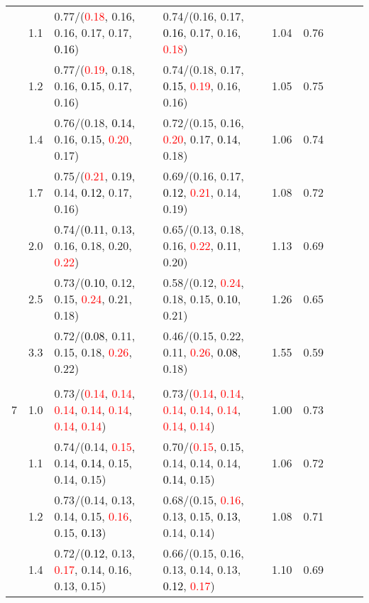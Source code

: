 \documentclass[10pt,a4paper]{report}
\begin{document}
\begin{table}[!htbp]
\begin{center}
{\begin{tabular}{ccllccccc}
			&1.1&0.77/(\textcolor{red}{0.18}, 0.16, 0.16, 0.17, 0.17, \textcolor{black}{0.16})&0.74/(0.16, 0.17, \textcolor{black}{0.16}, 0.17, 0.16, \textcolor{red}{0.18})&1.04&0.76\\
			&1.2&0.77/(\textcolor{red}{0.19}, 0.18, 0.16, \textcolor{black}{0.15}, 0.17, 0.16)&0.74/(0.18, 0.17, \textcolor{black}{0.15}, \textcolor{red}{0.19}, 0.16, 0.16)&1.05&0.75\\
			&1.4&0.76/(0.18, \textcolor{black}{0.14}, 0.16, 0.15, \textcolor{red}{0.20}, 0.17)&0.72/(0.15, 0.16, \textcolor{red}{0.20}, 0.17, \textcolor{black}{0.14}, 0.18)&1.06&0.74\\
			&1.7&0.75/(\textcolor{red}{0.21}, 0.19, 0.14, \textcolor{black}{0.12}, 0.17, 0.16)&0.69/(0.16, 0.17, \textcolor{black}{0.12}, \textcolor{red}{0.21}, 0.14, 0.19)&1.08&0.72\\
			&2.0&0.74/(\textcolor{black}{0.11}, 0.13, 0.16, 0.18, 0.20, \textcolor{red}{0.22})&0.65/(0.13, 0.18, 0.16, \textcolor{red}{0.22}, \textcolor{black}{0.11}, 0.20)&1.13&0.69\\
			&2.5&0.73/(\textcolor{black}{0.10}, 0.12, 0.15, \textcolor{red}{0.24}, 0.21, 0.18)&0.58/(0.12, \textcolor{red}{0.24}, 0.18, 0.15, \textcolor{black}{0.10}, 0.21)&1.26&0.65\\
			&3.3&0.72/(\textcolor{black}{0.08}, 0.11, 0.15, 0.18, \textcolor{red}{0.26}, 0.22)&0.46/(0.15, 0.22, 0.11, \textcolor{red}{0.26}, \textcolor{black}{0.08}, 0.18)&1.55&0.59\\
			&&&&\\
			7			&1.0&0.73/(\textcolor{red}{0.14}, \textcolor{red}{0.14}, \textcolor{red}{0.14}, \textcolor{red}{0.14}, \textcolor{red}{0.14}, \textcolor{red}{0.14}, \textcolor{red}{0.14})&0.73/(\textcolor{red}{0.14}, \textcolor{red}{0.14}, \textcolor{red}{0.14}, \textcolor{red}{0.14}, \textcolor{red}{0.14}, \textcolor{red}{0.14}, \textcolor{red}{0.14})&1.00&0.73\\
			&1.1&0.74/(0.14, \textcolor{red}{0.15}, 0.14, \textcolor{black}{0.14}, 0.15, 0.14, 0.15)&0.70/(\textcolor{red}{0.15}, 0.15, 0.14, 0.14, 0.14, \textcolor{black}{0.14}, 0.15)&1.06&0.72\\
			&1.2&0.73/(0.14, 0.13, 0.14, 0.15, \textcolor{red}{0.16}, 0.15, \textcolor{black}{0.13})&0.68/(0.15, \textcolor{red}{0.16}, 0.13, 0.15, \textcolor{black}{0.13}, 0.14, 0.14)&1.08&0.71\\
			&1.4&0.72/(\textcolor{black}{0.12}, 0.13, \textcolor{red}{0.17}, 0.14, 0.16, 0.13, 0.15)&0.66/(0.15, 0.16, 0.13, 0.14, 0.13, \textcolor{black}{0.12}, \textcolor{red}{0.17})&1.10&0.69\\

\end{tabular}}
\end{center}
\end{table}
\end{document}

